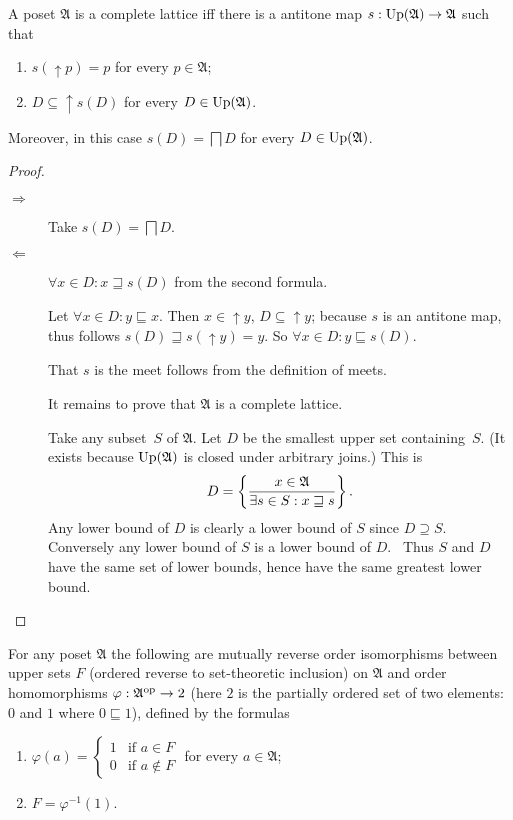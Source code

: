 \begin{thm}
\label{compl-via-down}A poset $\mathfrak{A}$ is a complete lattice
iff there is a antitone map $s:\operatorname{Up}(\mathfrak{A})\rightarrow\mathfrak{A}$
such that
\begin{enumerate}
\item $s(\uparrow p)=p$ for every $p\in\mathfrak{A}$;
\item $D\subseteq\uparrow s(D)$ for every $D\in\operatorname{Up}(\mathfrak{A})$.
\end{enumerate}
Moreover, in this case $s(D)=\bigsqcap D$ for every $D\in\operatorname{Up}(\mathfrak{A})$.\end{thm}
\begin{proof}
~
\begin{description}
\item [{$\Rightarrow$}] Take $s(D)=\bigsqcap D$.
\item [{$\Leftarrow$}] $\forall x\in D:x\sqsupseteq s(D)$ from the second
formula.


Let $\forall x\in D:y\sqsubseteq x$. Then $x\in\uparrow y$, $D\subseteq\uparrow y$;
because $s$ is an antitone map, thus follows $s(D)\sqsupseteq s(\uparrow y)=y$.
So $\forall x\in D:y\sqsubseteq s(D)$.


That $s$ is the meet follows from the definition of meets.


It remains to prove that $\mathfrak{A}$ is a complete lattice.


Take any subset~$S$ of $\mathfrak{A}$. Let $D$ be the smallest
upper set containing~$S$. (It exists because $\operatorname{Up}(\mathfrak{A})$
is closed under arbitrary joins.) This is 
\[
D=\left\{ \frac{x\in\mathfrak{A}}{\exists s\in S:x\sqsupseteq s}\right\}.
\]
Any lower bound of $D$ is clearly a lower bound of $S$ since $D\supseteq S$.
Conversely any lower bound of $S$ is a lower bound of $D$.~ Thus
$S$ and $D$ have the same set of lower bounds, hence have the same
greatest lower bound.

\end{description}
\end{proof}
\begin{prop}
\label{down-is-homo}For any poset $\mathfrak{A}$ the following are
mutually reverse order isomorphisms between upper sets $F$ (ordered
reverse to set-theoretic inclusion) on $\mathfrak{A}$ and order homomorphisms
$\varphi:\mathfrak{A}^{\operatorname{op}}\rightarrow2$ (here $2$ is the partially
ordered set of two elements: $0$ and $1$ where $0\sqsubseteq1$),
defined by the formulas 
\begin{enumerate}
\item \label{phi-01}$\varphi(a)=\left\{ \begin{array}{ll}
1 & \text{if }a\in F\\
0 & \text{if }a\notin F
\end{array}\right.$ for every $a\in\mathfrak{A}$;
\item \label{phi-inv}$F=\varphi^{-1}(1)$. 
\end{enumerate}
\end{prop}

